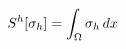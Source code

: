 \documentclass[preview]{standalone}
\begin{document}
\begin{align*}
\special{dvisvgm:raw <g id='unique000'>}S^h[\sigma_h]=\int_\Omega\sigma_h\,dx\special{dvisvgm:raw </g>}
\end{align*}
\end{document}
